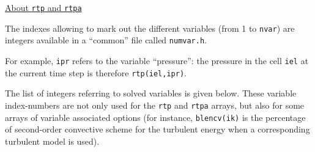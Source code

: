 {{{





\bigskip

\underline{About \texttt{rtp} and \texttt{rtpa}}

The indexes allowing to mark out the different variables (from 1 to
\texttt{nvar}) are integers available in a ``common'' file called
\texttt{numvar.h}.

For example, \texttt{ipr} refers to the variable ``pressure'':
the pressure in the cell \texttt{iel} at the current time step is
therefore \texttt{rtp(iel,ipr)}.

The list of integers referring to solved variables is given below. These
variable index-numbers are not only used for the \texttt{rtp} and
\texttt{rtpa} arrays, but also for some arrays of variable associated options
(for instance, \texttt{blencv(ik)} is the percentage of second-order
convective scheme for the turbulent energy
when a corresponding turbulent model is used).

}}}

